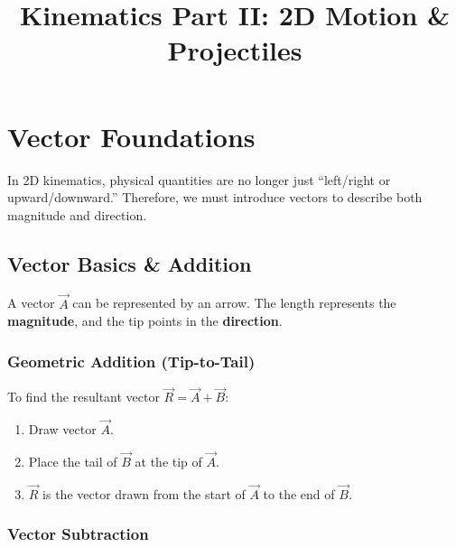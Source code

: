 \documentclass{article}
\begin{document}
\title{Kinematics Part II: 2D Motion \& Projectiles}
\author{}
\date{}
\maketitle

\section{Vector Foundations}

In 2D kinematics, physical quantities are no longer just ``left/right or upward/downward.'' Therefore, we must introduce vectors to describe both magnitude and direction.

\subsection{Vector Basics \& Addition}
A vector $\vec{A}$ can be represented by an arrow. The length represents the \textbf{magnitude}, and the tip points in the \textbf{direction}.

\subsubsection{Geometric Addition (Tip-to-Tail)}

\begin{center}
\end{center}

To find the resultant vector $\vec{R} = \vec{A} + \vec{B}$:
\begin{enumerate}
  \item Draw vector $\vec{A}$.
  \item Place the tail of $\vec{B}$ at the tip of $\vec{A}$.
  \item $\vec{R}$ is the vector drawn from the start of $\vec{A}$ to the end of $\vec{B}$.
\end{enumerate}

\subsubsection{Vector Subtraction}
\end{document}
